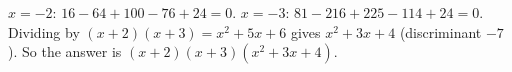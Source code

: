 $x=-2$: $16-64+100-76+24=0$. $x=-3$: $81-216+225-114+24=0$. Dividing by $(x+2)(x+3)=x^2+5x+6$ gives $x^2+3x+4$ (discriminant $-7$). So the answer is $\boxed{(x+2)(x+3)(x^2+3x+4)}$.
